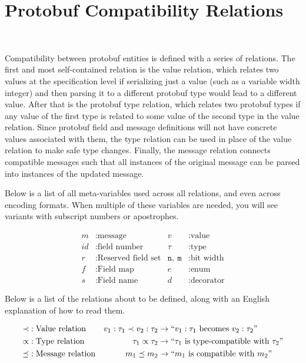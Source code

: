 \section{Protobuf Compatibility Relations}~\label{sec:comp-rel}

Compatibility between protobuf entities is defined with a series of
relations. The first and most self-contained relation is the value relation,
which relates two values at the specification level if serializing just a value
(such as a variable width integer) and then parsing it to a different protobuf
type would lead to a different value. After that is the protobuf type relation,
which relates two protobuf types if any value of the first type is related to
some value of the second type in the value relation. Since protobuf field and
message definitions will not have concrete values associated with them, the type
relation can be used in place of the value relation to make safe type
changes. Finally, the message relation connects compatible messages such that
all instances of the original message can be parsed into instances of the updated
message.

Below is a list of all meta-variables used across all relations, and even across
encoding formats. When multiple of these variables are needed, you will see
variants with subscript numbers or apostrophes.

\begin{align*}
  m &: \text{message} & v &: \text{value} \\
  id &: \text{field number} & \tau &: \text{type} \\
  r &: \text{Reserved field set} & \mathtt{n},\ \mathtt{m} &: \text{bit width} \\
  f &: \text{Field map} & e &: \text{enum} \\
  s &: \text{Field name} & d &: \text{decorator}
\end{align*}

Below is a list of the relations about to be defined, along with an English
explanation of how to read them.

\begin{align*}
  \prec &: \text{Value relation} & v_1 : \tau_1 \prec v_2 : \tau_2 &\rightarrow ``v_1 : \tau_1 \text{ becomes } v_2 :
                                           \tau_2 " \\
  \propto &: \text{Type relation} & \tau_1 \propto \tau_2 &\rightarrow ``\tau_1\text{ is type-compatible with }
                                          \tau_2" \\
  \preceq &: \text{Message relation} & m_1 \preceq m_2 &\rightarrow ``m_1 \text{ is compatible with } m_2"
\end{align*}


